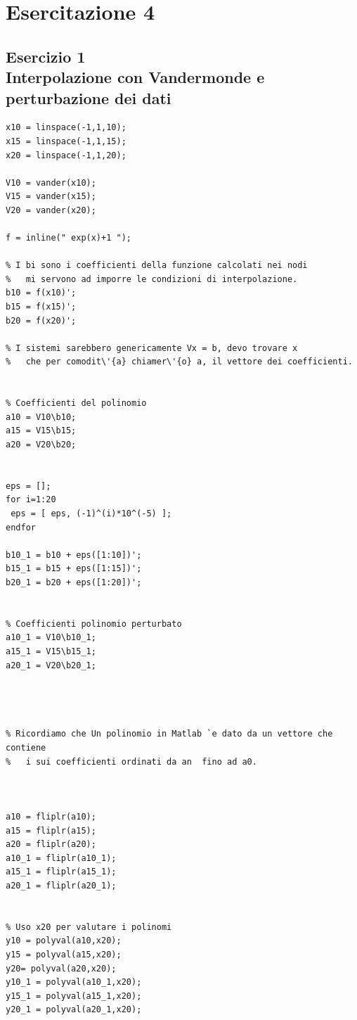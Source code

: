 \documentclass{article}
\begin{document}
\newpage
\section{ Esercitazione 4}


\subsection{ Esercizio 1 \\ Interpolazione con Vandermonde e perturbazione dei dati}
\begin{lstlisting}
x10 = linspace(-1,1,10);
x15 = linspace(-1,1,15);
x20 = linspace(-1,1,20);

V10 = vander(x10);
V15 = vander(x15); 
V20 = vander(x20);

f = inline(" exp(x)+1 ");

% I bi sono i coefficienti della funzione calcolati nei nodi 
%   mi servono ad imporre le condizioni di interpolazione.
b10 = f(x10)';
b15 = f(x15)';
b20 = f(x20)';

% I sistemi sarebbero genericamente Vx = b, devo trovare x
%   che per comodit\'{a} chiamer\'{o} a, il vettore dei coefficienti.


% Coefficienti del polinomio  
a10 = V10\b10;
a15 = V15\b15;
a20 = V20\b20;


eps = [];
for i=1:20
 eps = [ eps, (-1)^(i)*10^(-5) ];
endfor

b10_1 = b10 + eps([1:10])';
b15_1 = b15 + eps([1:15])';
b20_1 = b20 + eps([1:20])';


% Coefficienti polinomio perturbato
a10_1 = V10\b10_1;
a15_1 = V15\b15_1;
a20_1 = V20\b20_1;




% Ricordiamo che Un polinomio in Matlab `e dato da un vettore che contiene 
%   i sui coefficienti ordinati da an  fino ad a0.



a10 = fliplr(a10);
a15 = fliplr(a15);
a20 = fliplr(a20);
a10_1 = fliplr(a10_1);
a15_1 = fliplr(a15_1);
a20_1 = fliplr(a20_1);


% Uso x20 per valutare i polinomi 
y10 = polyval(a10,x20);
y15 = polyval(a15,x20);
y20= polyval(a20,x20);
y10_1 = polyval(a10_1,x20);
y15_1 = polyval(a15_1,x20);
y20_1 = polyval(a20_1,x20);


\end{lstlisting}
\end{document}
